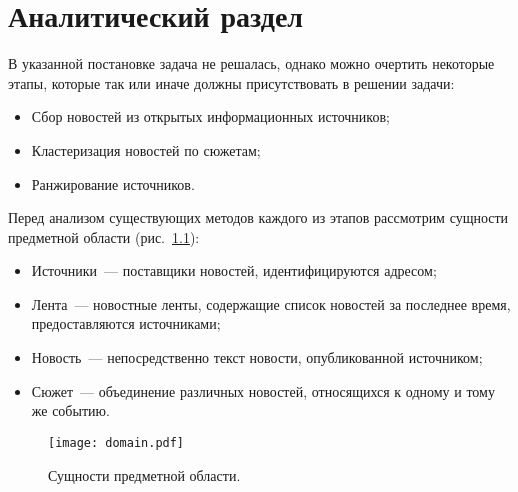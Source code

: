 \chapter{Аналитический раздел}
В указанной постановке задача не решалась, однако можно очертить некоторые этапы, которые так или иначе должны присутствовать в решении задачи:
\begin{itemize}
    \item Сбор новостей из открытых информационных источников;
    \item Кластеризация новостей по сюжетам;
    \item Ранжирование источников.
\end{itemize}

Перед анализом существующих методов каждого из этапов рассмотрим сущности предметной области (рис.~\ref{fig:domain}):
\begin{itemize}
    \item Источники~--- поставщики новостей, идентифицируются адресом;
    \item Лента~--- новостные ленты, содержащие список новостей за последнее время, предоставляются источниками;
    \item Новость~--- непосредственно текст новости, опубликованной источником;
    \item Сюжет~--- объединение различных новостей, относящихся к одному и тому же событию.
\end{itemize}

\begin{figure}[h]
    \centering
    \texttt{[image: domain.pdf]}
    \caption{Сущности предметной области.}
    \label{fig:domain}
\end{figure}




